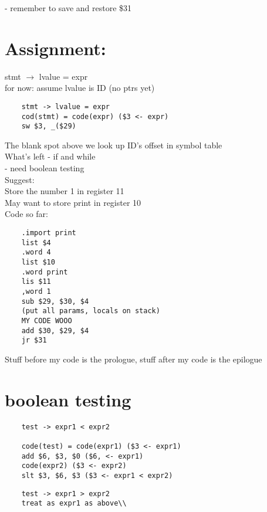 \documentclass[12pt]{article}
\begin{document}
	- remember to save and restore \$31\\
	
	\section*{Assignment:}
	stmt $\rightarrow$ lvalue = expr\\
	for now: assume lvalue is ID (no ptrs yet)\\
	
	\begin{verbatim}
	stmt -> lvalue = expr
	cod(stmt) = code(expr) ($3 <- expr)
	sw $3, _($29)
	\end{verbatim}
	
	The blank spot above we look up ID's offset in symbol table\\
	
	What's left - if and while\\
	- need boolean testing\\
	Suggest:\\
	Store the number 1 in register 11\\
	May want to store print in register 10\\
	Code so far:\\
	\begin{verbatim}
	.import print
	list $4
	.word 4
	list $10
	.word print
	lis $11
	,word 1
	sub $29, $30, $4
	(put all params, locals on stack)
	MY CODE WOOO
	add $30, $29, $4
	jr $31
	\end{verbatim}
	
	Stuff before my code is the prologue, stuff after my code is the epilogue\\
	
	\section*{boolean testing}
	\begin{verbatim}
	test -> expr1 < expr2
	
	code(test) = code(expr1) ($3 <- expr1)
	add $6, $3, $0 ($6, <- expr1)
	code(expr2) ($3 <- expr2)
	slt $3, $6, $3 ($3 <- expr1 < expr2)
	\end{verbatim}
	
	\begin{verbatim}
	test -> expr1 > expr2
	treat as expr1 as above\\
	\end{verbatim}
	
\end{document}
